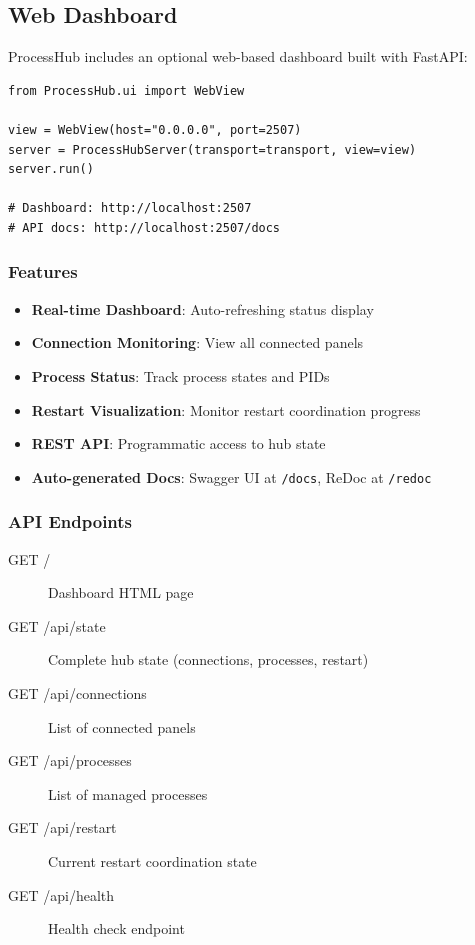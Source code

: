 \subsection{Web Dashboard}

ProcessHub includes an optional web-based dashboard built with FastAPI:

\begin{verbatim}
from ProcessHub.ui import WebView

view = WebView(host="0.0.0.0", port=2507)
server = ProcessHubServer(transport=transport, view=view)
server.run()

# Dashboard: http://localhost:2507
# API docs: http://localhost:2507/docs
\end{verbatim}

\subsubsection{Features}

\begin{itemize}
   \item \textbf{Real-time Dashboard}: Auto-refreshing status display
   \item \textbf{Connection Monitoring}: View all connected panels
   \item \textbf{Process Status}: Track process states and PIDs
   \item \textbf{Restart Visualization}: Monitor restart coordination progress
   \item \textbf{REST API}: Programmatic access to hub state
   \item \textbf{Auto-generated Docs}: Swagger UI at \texttt{/docs}, ReDoc at \texttt{/redoc}
\end{itemize}

\subsubsection{API Endpoints}

\begin{description}
   \item[GET /] Dashboard HTML page
   \item[GET /api/state] Complete hub state (connections, processes, restart)
   \item[GET /api/connections] List of connected panels
   \item[GET /api/processes] List of managed processes
   \item[GET /api/restart] Current restart coordination state
   \item[GET /api/health] Health check endpoint
\end{description}

